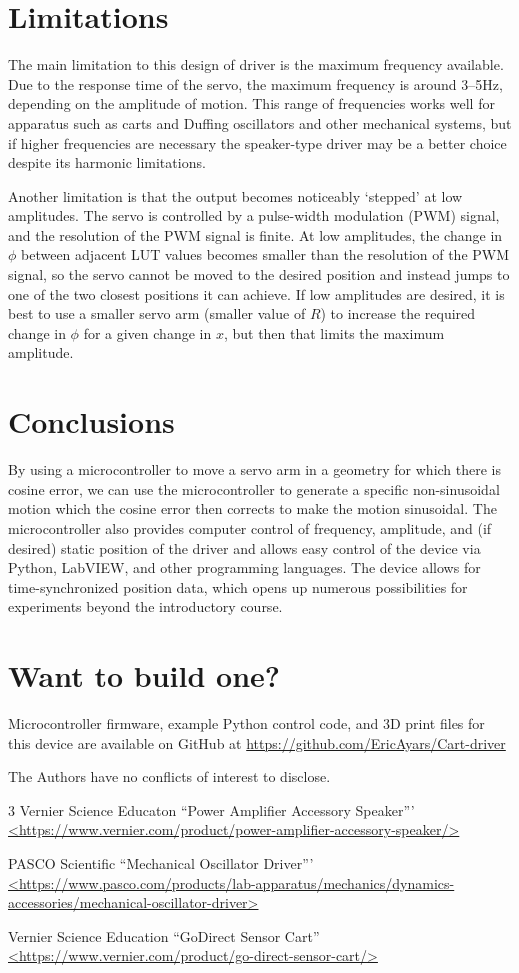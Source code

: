 \documentclass[prb,preprint]{revtex4-1}
\begin{document}
\section{Limitations}
The main limitation to this design of driver is the maximum frequency available. 
Due to the response time of the servo, the maximum frequency is around 3--5Hz, depending on the amplitude of motion.
This range of frequencies works well for apparatus such as carts and Duffing oscillators and other mechanical systems, but if higher frequencies are necessary the speaker-type driver may be a better choice despite its harmonic limitations.

Another limitation is that the output becomes noticeably `stepped' at low amplitudes.
The servo is controlled by a pulse-width modulation (PWM) signal, and the resolution of the PWM signal is finite.
At low amplitudes, the change in $\phi$ between adjacent LUT values becomes smaller than the resolution of the PWM signal, so the servo cannot be moved to the desired position and instead jumps to one of the two closest positions it can achieve. 
If low amplitudes are desired, it is best to use a smaller servo arm (smaller value of $R$) to increase the required change in $\phi$ for a given change in $x$, but then that limits the maximum amplitude. 

\section{Conclusions}
By using a microcontroller to move a servo arm in a geometry for which there is cosine error, we can use the microcontroller to generate a specific non-sinusoidal motion which the cosine error then corrects to make the motion sinusoidal.
The microcontroller also provides computer control of frequency, amplitude, and (if desired) static position of the driver and allows easy control of the device via Python, LabVIEW, and other programming languages. 
The device allows for time-synchronized position data, which opens up numerous possibilities for experiments beyond the introductory course.

\section{Want to build one?}
Microcontroller firmware, example Python control code, and 3D print files for this device are available on GitHub at \url{https://github.com/EricAyars/Cart-driver}

The Authors have no conflicts of interest to disclose.

\begin{thebibliography}{3}
 Vernier Science Educaton ``Power Amplifier Accessory Speaker''' \url{<https://www.vernier.com/product/power-amplifier-accessory-speaker/>}

 PASCO Scientific ``Mechanical Oscillator Driver''' \url{<https://www.pasco.com/products/lab-apparatus/mechanics/dynamics-accessories/mechanical-oscillator-driver>}

 Vernier Science Education ``GoDirect Sensor Cart'' \url{<https://www.vernier.com/product/go-direct-sensor-cart/>}

\end{thebibliography}
\end{document}
